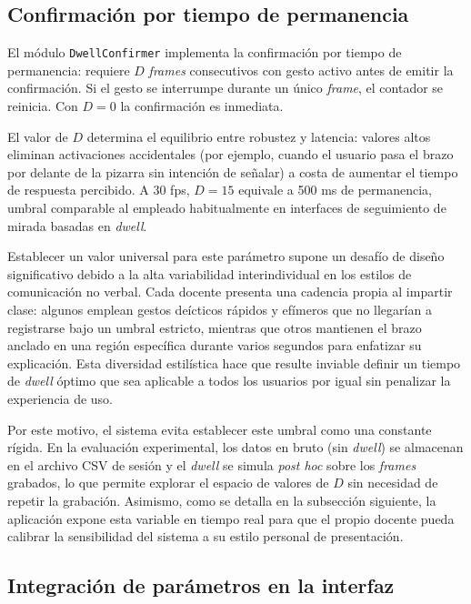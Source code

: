 \documentclass[12pt]{report} %
\begin{document}
\subsection{Confirmación por tiempo de permanencia}

El módulo \texttt{DwellConfirmer} implementa la confirmación por tiempo de permanencia: requiere $D$ \textit{frames} consecutivos con gesto activo antes de emitir la confirmación. Si el gesto se interrumpe durante un único \textit{frame}, el contador se reinicia. Con $D = 0$ la confirmación es inmediata.

El valor de $D$ determina el equilibrio entre robustez y latencia: valores altos eliminan activaciones accidentales (por ejemplo, cuando el usuario pasa el brazo por delante de la pizarra sin intención de señalar) a costa de aumentar el tiempo de respuesta percibido. A 30 fps, $D = 15$ equivale a 500 ms de permanencia, umbral comparable al empleado habitualmente en interfaces de seguimiento de mirada basadas en \textit{dwell}. 

Establecer un valor universal para este parámetro supone un desafío de diseño significativo debido a la alta variabilidad interindividual en los estilos de comunicación no verbal. Cada docente presenta una cadencia propia al impartir clase: algunos emplean gestos deícticos rápidos y efímeros que no llegarían a registrarse bajo un umbral estricto, mientras que otros mantienen el brazo anclado en una región específica durante varios segundos para enfatizar su explicación. Esta diversidad estilística hace que resulte inviable definir un tiempo de \textit{dwell} óptimo que sea aplicable a todos los usuarios por igual sin penalizar la experiencia de uso.

Por este motivo, el sistema evita establecer este umbral como una constante rígida. En la evaluación experimental, los datos en bruto (sin \textit{dwell}) se almacenan en el archivo CSV de sesión y el \textit{dwell} se simula \textit{post hoc} sobre los \textit{frames} grabados, lo que permite explorar el espacio de valores de $D$ sin necesidad de repetir la grabación. Asimismo, como se detalla en la subsección siguiente, la aplicación expone esta variable en tiempo real para que el propio docente pueda calibrar la sensibilidad del sistema a su estilo personal de presentación.

\subsection{Integración de parámetros en la interfaz}
\end{document}
